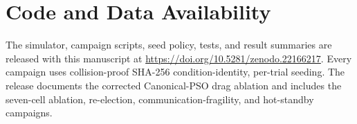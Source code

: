 \documentclass[conference]{IEEEtran}
\begin{document}
\section*{Code and Data Availability}
\label{sec:avail}
The simulator, campaign scripts, seed policy, tests, and result summaries are released with this manuscript at \url{https://doi.org/10.5281/zenodo.22166217}. Every campaign uses collision-proof SHA-256 condition-identity, per-trial seeding. The release documents the corrected Canonical-PSO drag ablation and includes the seven-cell ablation, re-election, communication-fragility, and hot-standby campaigns.

\let\OLDthebibliography\thebibliography
\renewcommand\thebibliography[1]{%
  \OLDthebibliography{#1}%
  \scriptsize
  \setlength{\itemsep}{0pt}%
  \setlength{\parskip}{0pt}%
}



\end{document}
